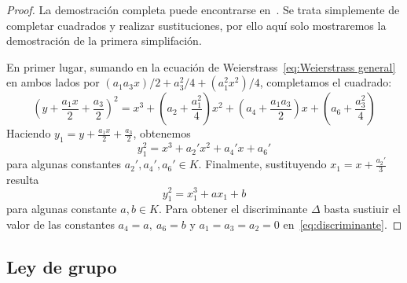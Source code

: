 \begin{proof}
La demostración completa puede encontrarse en~\cite[sección III.1]{Silverman:2009}. Se trata simplemente de completar cuadrados y realizar sustituciones, por ello aquí solo mostraremos la demostración de la primera simplifación.

En primer lugar, sumando en la ecuación de Weierstrass~\eqref{eq:Weierstrass general} en ambos lados por $(a_1 a_3 x)/2 + a_3^2/4 + (a_1^2 x^2)/4$, completamos el cuadrado:
$$
\left(y + \frac{a_1 x}{2} + \frac{a_3}{2}\right)^2 = x^3 + \left(a_2 + \frac{a_1^2}{4}\right)x^2 + \left(a_4 + \frac{a_1 a_3}{2}\right)x + \left(a_6 + \frac{a_3^2}{4}\right)
$$
Haciendo $y_1 = y + \frac{a_1 x}{2} + \frac{a_3}{2}$, obtenemos
$$
y_1^2 = x^3 + a_2' x^2 + a_4' x + a_6'
$$
para algunas constantes $a_2', a_4', a_6' \in K$. Finalmente, sustituyendo $x_1 = x + \frac{a_2'}{3}$ resulta
$$
y_1^2 = x_1^3 + a x_1 + b
$$
para algunas constante $a, b \in K$. Para obtener el discriminante $\Delta$ basta sustiuir el valor de las constantes $a_4 = a,\ a_6 = b$ y $a_1 = a_3 = a_2 = 0$ en~\eqref{eq:discriminante}.
\end{proof}

\subsection{Ley de grupo}
\label{sub:Ley de grupo}



